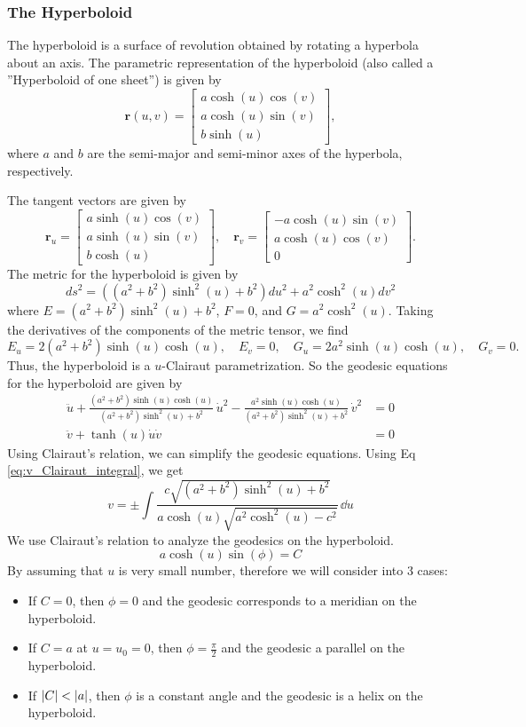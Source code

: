 \documentclass[12pt]{article}
\begin{document}
\subsubsection{The Hyperboloid}

The hyperboloid is a surface of revolution obtained by rotating a hyperbola about an axis.
The parametric representation of the hyperboloid (also called a ”Hyperboloid of one sheet”) is given by
\[
    \mathbf{r}(u, v) = \begin{bmatrix} a \cosh (u) \cos (v) \\ a \cosh (u) \sin (v) \\ b \sinh (u) \end{bmatrix},
\]
where \(a\) and \(b\) are the semi-major and semi-minor axes of the hyperbola, respectively.

The tangent vectors are given by
\[
    \mathbf{r}_u = \begin{bmatrix} a \sinh (u) \cos (v) \\ a \sinh (u) \sin (v) \\ b \cosh (u) \end{bmatrix}, \quad \mathbf{r}_v = \begin{bmatrix} -a \cosh (u) \sin (v) \\ a \cosh (u) \cos (v) \\ 0 \end{bmatrix}.
\]
The metric for the hyperboloid is given by
\[
    ds^2 = ((a^2 + b^2)\sinh^{2}(u) + b^2) du^2 + a^2 \cosh^{2}(u) dv^2
\]
where \(E = (a^2 + b^2)\sinh^{2}(u) + b^2\), \(F = 0\), and \(G = a^2 \cosh^{2}(u)\).
Taking the derivatives of the components of the metric tensor, we find
\[
    E_u = 2(a^2 + b^2)\sinh(u)\cosh(u), \quad E_v = 0, \quad G_u = 2a^2 \sinh(u) \cosh(u), \quad G_v = 0.
\]
Thus, the hyperboloid is a $u$-Clairaut parametrization.
So the geodesic equations for the hyperboloid are given by
\begin{align*}
    \ddot{u} + \frac{(a^2 + b^2)\sinh(u)\cosh(u)}{(a^2 + b^2)\sinh^{2}(u) + b^2}\,\dot{u}^2 - \frac{a^2 \sinh(u) \cosh(u)}{(a^2 + b^2)\sinh^{2}(u) + b^2}\,\dot{v}^{2} &= 0 \\
    \ddot{v} + \tanh(u) \dot{u} \dot{v} &= 0
\end{align*}
Using Clairaut's relation, we can simplify the geodesic equations.
Using Eq \eqref{eq:v_Clairaut_integral}, we get
\[
    v = \pm \int \frac{c\sqrt{(a^2 + b^2)\sinh^2(u) + b^2}}{a\cosh(u)\sqrt{a^2\cosh^2(u) - c^2}}\,\dd{u}
\]
We use Clairaut's relation to analyze the geodesics on the hyperboloid.
\[
    a \cosh(u) \sin(\phi) = C  
\]
By assuming that $u$ is very small number, therefore we will consider into 3 cases:
\begin{itemize}
    \item If $C = 0$, then $\phi = 0$ and the geodesic corresponds to a meridian on the hyperboloid.
    \item If $C = a$ at $u = u_0 = 0$, then $\phi = \frac{\pi}{2}$ and the geodesic a parallel on the hyperboloid.
    \item If $\abs{C} < \abs{a}$, then $\phi$ is a constant angle and the geodesic is a helix on the hyperboloid.
\end{itemize}
\end{document}
